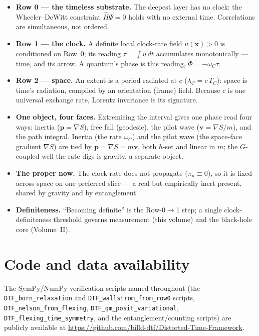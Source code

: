 \documentclass[11pt]{article}
\begin{document}
\begin{itemize}[leftmargin=1.4em,itemsep=3pt,topsep=3pt]
  \item \textbf{Row 0 --- the timeless substrate.} The deepest layer has no clock: the Wheeler--DeWitt
    constraint $\hat H\Psi=0$ holds with no external time. Correlations are simultaneous, not ordered.
  \item \textbf{Row 1 --- the clock.} A definite local clock-rate field $u(\mathbf x)>0$ is conditioned
    on Row~0; its reading $\tau=\int u\,dt$ accumulates monotonically --- time, and its arrow. A
    quantum's phase is this reading, $\Phi=-\omega_C\tau$.
  \item \textbf{Row 2 --- space.} An extent is a period radiated at $c$ ($\lambda_C=c\,T_C$): space is
    time's radiation, compiled by an orientation (frame) field. Because $c$ is one universal exchange
    rate, Lorentz invariance is its signature.
  \item \textbf{One object, four faces.} Extremising the interval gives one phase read four ways: inertia
    ($\mathbf p=\nabla S$), free fall (geodesic), the pilot wave ($\mathbf v=\nabla S/m$), and the path
    integral. Inertia (the rate $\omega_C$) and the pilot wave (the space-face gradient $\nabla S$) are
    tied by $\mathbf p=\nabla S=m\mathbf v$, both $\hbar$-set and linear in $m$; the $G$-coupled well the
    rate digs is gravity, a separate object.
  \item \textbf{The proper now.} The clock rate does not propagate ($\pi_u\equiv0$), so it is fixed
    across space on one preferred slice --- a real but empirically inert present, shared by gravity and
    by entanglement.
  \item \textbf{Definiteness.} ``Becoming definite'' is the Row-0$\to$1 step; a single
    clock-definiteness threshold governs measurement (this volume) and the black-hole core (Volume~II).
\end{itemize}

\section*{Code and data availability}
{\small The SymPy/NumPy verification scripts named throughout (the \texttt{DTF\_born\_relaxation} and
\texttt{DTF\_wallstrom\_from\_row0} scripts, \texttt{DTF\_nelson\_from\_flexing},
\texttt{DTF\_qm\_posit\_variational}, \texttt{DTF\_flexing\_time\_symmetry}, and the entanglement/counting
scripts) are publicly available at \url{https://github.com/billd-dtf/Distorted-Time-Framework}.\par}
\end{document}
